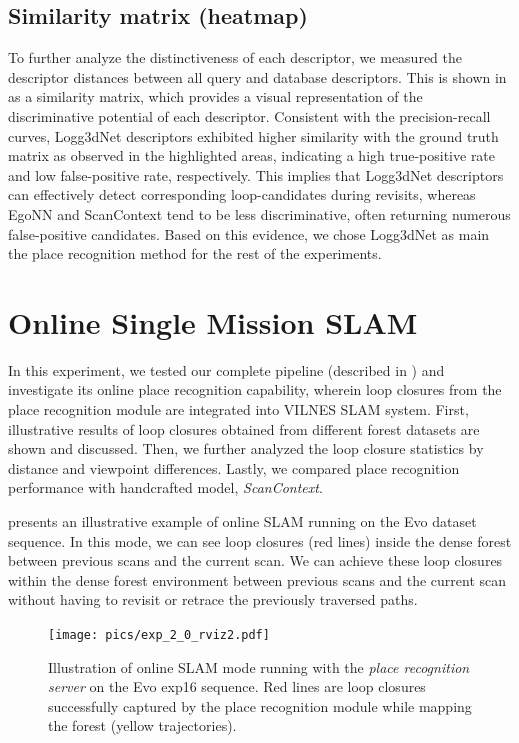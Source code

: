 \subsection*{Similarity matrix (heatmap)}
To further analyze the distinctiveness of each descriptor, we measured the descriptor distances between all query and database descriptors. This is shown in  as a similarity matrix, which provides a visual representation of the discriminative potential of each descriptor. Consistent with the precision-recall curves, Logg3dNet descriptors exhibited higher similarity with the ground truth matrix as observed in the highlighted areas, indicating a high true-positive rate and low false-positive rate, respectively. This implies that Logg3dNet descriptors can effectively detect corresponding loop-candidates during revisits, whereas EgoNN and ScanContext tend to be less discriminative, often returning numerous false-positive candidates. Based on this evidence, we chose Logg3dNet as main the place recognition method for the rest of the experiments.





\section{Online Single Mission SLAM}
\label{sec:exp_online_slam}
In this experiment, we tested our complete pipeline (described in ) and investigate its online place recognition capability, wherein loop closures from the place recognition module are integrated into VILNES SLAM system. First, illustrative results of loop closures obtained from different forest datasets are shown and discussed. Then, we further analyzed the loop closure statistics by distance and viewpoint differences. Lastly, we compared place recognition performance with handcrafted model, \emph{ScanContext}. 

 presents an illustrative example of online SLAM running on the Evo dataset sequence. In this mode, we can see loop closures (red lines) inside the dense forest between previous scans and the current scan. We can achieve these loop closures within the dense forest environment between previous scans and the current scan without having to revisit or retrace the previously traversed paths.
\begin{figure}[htbp]
  \centering
  \texttt{[image: pics/exp\_2\_0\_rviz2.pdf]}
  \caption{Illustration of online SLAM mode running with the \emph{place recognition server} on the Evo exp16 sequence. Red lines are loop closures successfully captured by the place recognition module while mapping the forest (yellow trajectories).}
  \label{fig:exp_2_0_rviz}
\end{figure}



